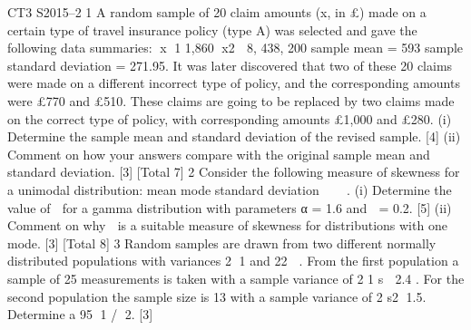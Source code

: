 \documentclass[a4paper,12pt]{article}
\begin{document}
\begin{enumerate}

CT3 S2015–2
1 A random sample of 20 claim amounts (x, in £) made on a certain type of travel
insurance policy (type A) was selected and gave the following data summaries:
  x 1 1,860
x2  8, 438, 200
sample mean = 593
sample standard deviation = 271.95.
It was later discovered that two of these 20 claims were made on a different incorrect
type of policy, and the corresponding amounts were £770 and £510.
These claims are going to be replaced by two claims made on the correct type of
policy, with corresponding amounts £1,000 and £280.
(i) Determine the sample mean and standard deviation of the revised sample. [4]
(ii) Comment on how your answers compare with the original sample mean and
standard deviation. [3]
[Total 7]
2 Consider the following measure of skewness for a unimodal distribution:
  mean mode
standard deviation

  .
(i) Determine the value of  for a gamma distribution with parameters α = 1.6 and
 = 0.2. [5]
(ii) Comment on why  is a suitable measure of skewness for distributions with
one mode. [3]
[Total 8]
3 Random samples are drawn from two different normally distributed populations with
variances 2
1 and 22
 . From the first population a sample of 25 measurements is taken
with a sample variance of 2
1 s  2.4 . For the second population the sample size is 13
with a sample variance of 2
s2 1.5.
Determine a 95%
1 / 2. [3]


\end{enumerate}
\end{document}
